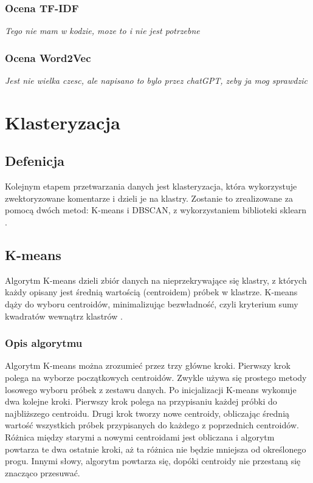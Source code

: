 		\subsubsection{Ocena  TF-IDF}
			\textit{Tego nie mam w kodzie, moze to i nie jest potrzebne}
		
		\subsubsection{Ocena  Word2Vec}
			\textit{Jest nie wielka czesc, ale napisano to bylo przez chatGPT, zeby ja mog sprawdzic}
		
	
\section{Klasteryzacja}

	\subsection{Defenicja}
		Kolejnym etapem przetwarzania danych jest klasteryzacja, która wykorzystuje zwektoryzowane komentarze i dzieli je na klastry. Zostanie to zrealizowane za pomocą dwóch metod: K-means i DBSCAN, z wykorzystaniem biblioteki sklearn \cite{scikit-learn, dbscan}.
	
	\subsection{K-means}
 		Algorytm K-means dzieli zbiór danych na nieprzekrywające się klastry, z których każdy opisany jest średnią wartością (centroidem) próbek w klastrze. K-means dąży do wyboru centroidów, minimalizując bezwładność, czyli kryterium sumy kwadratów wewnątrz klastrów \cite{k-means}.
	
		\subsubsection{Opis algorytmu}
			Algorytm K-means można zrozumieć przez trzy główne kroki. Pierwszy krok polega na wyborze początkowych centroidów. Zwykle używa się prostego metody losowego wyboru próbek z zestawu danych. Po inicjalizacji K-means wykonuje dwa kolejne kroki. Pierwszy krok polega na przypisaniu każdej próbki do najbliższego centroidu. Drugi krok tworzy nowe centroidy, obliczając średnią wartość wszystkich próbek przypisanych do każdego z poprzednich centroidów. Różnica między starymi a nowymi centroidami jest obliczana i algorytm powtarza te dwa ostatnie kroki, aż ta różnica nie będzie mniejsza od określonego progu. Innymi słowy, algorytm powtarza się, dopóki centroidy nie przestaną się znacząco przesuwać.

